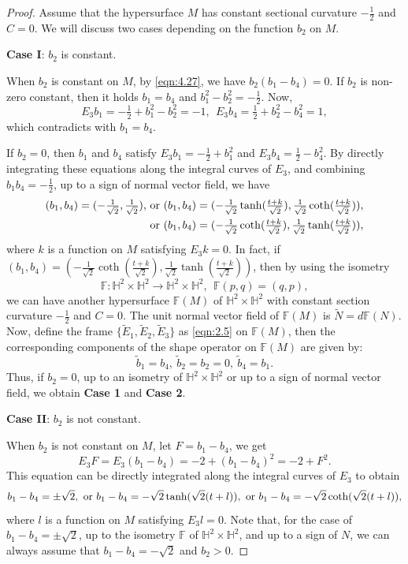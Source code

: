 \documentclass[reqno]{amsart}%
\theoremstyle{definition}
\numberwithin{equation}{section}
\begin{document}
\begin{proof}
Assume that the hypersurface $M$ has constant sectional curvature $-\frac{1}{2}$ and $C=0$.
We will discuss two cases depending on the function $b_2$ on $M$.

{\bf Case I}: $b_2$ is constant.

When $b_2$ is constant on $M$, by \eqref{eqn:4.27}, we have $b_2(b_1-b_4)=0$.
If $b_2$ is non-zero constant, then it holds $b_1=b_4$ and $b_1^2-b_2^2=-\frac{1}{2}$. Now,
$$
E_3b_1=-\tfrac{1}{2}+b_1^{2}-b_2^2=-1,\ \ E_3b_4=\tfrac{1}{2}+b_2^{2}-b_4^2=1,
$$
which contradicts with $b_1=b_4$.

If $b_2=0$, then $b_1$ and $b_4$ satisfy $E_3b_1=-\tfrac{1}{2}+b_1^2$ and $E_3b_4=\tfrac{1}{2}-b_4^2$.
By directly integrating these equations along the integral curves of $E_3$,
and combining $b_1b_4=-\tfrac{1}{2}$, up to a sign of normal vector field,
we have
$$
\begin{aligned}
(b_1,b_4)=(-\tfrac{1}{\sqrt{2}},\tfrac{1}{\sqrt{2}}),\ &{\rm or}\
(b_1,b_4)=(-\tfrac{1}{\sqrt{2}}\tanh(\tfrac{t+k}{\sqrt{2}}),
\tfrac{1}{\sqrt{2}}\coth(\tfrac{t+k}{\sqrt{2}})),\\
&  {\rm or}\ (b_1,b_4)=(-\tfrac{1}{\sqrt{2}}\coth(\tfrac{t+k}{\sqrt{2}}),
\tfrac{1}{\sqrt{2}}\tanh(\tfrac{t+k}{\sqrt{2}})),
\end{aligned}
$$
where $k$ is a function on $M$ satisfying $E_3k=0$.
In fact, if $(b_1,b_4)=(-\tfrac{1}{\sqrt{2}}\coth(\tfrac{t+k}{\sqrt{2}}),
\tfrac{1}{\sqrt{2}}\tanh(\tfrac{t+k}{\sqrt{2}}))$, then by using the isometry
$$
\mathbb{F}:\mathbb{H}^2\times \mathbb{H}^2\rightarrow\mathbb{H}^2\times \mathbb{H}^2,\ \
\mathbb{F}(p,q)=(q,p),
$$
we can have another hypersurface $\mathbb{F}(M)$ of $\mathbb{H}^2\times \mathbb{H}^2$
with constant section curvature $-\frac{1}{2}$ and $C=0$. The unit normal vector field
of $\mathbb{F}(M)$ is $\tilde{N}=d\mathbb{F}(N)$.
Now, define the frame $\{\tilde{E}_1,\tilde{E}_2,\tilde{E}_3\}$ as \eqref{eqn:2.5} on $\mathbb{F}(M)$,
then the corresponding components of the shape operator on $\mathbb{F}(M)$ are given by:
$$
\tilde{b}_1=b_4,\ \tilde{b}_2=b_2=0,\ \tilde{b}_4=b_1.
$$
Thus, if $b_2=0$, up to an isometry of $\mathbb{H}^2\times \mathbb{H}^2$
or up to a sign of normal vector field, we obtain {\bf Case 1} and {\bf Case 2}.

\vskip 2mm

{\bf Case II}: $b_2$ is not constant.

When $b_2$ is not constant on $M$, let $F=b_1-b_4$, we get
$$
E_3F=E_3(b_1-b_4)=-2+(b_1-b_4)^2=-2+F^2.
$$
This equation can be directly integrated along the integral curves of $E_3$
to obtain
\begin{equation}\label{eqn:5.1a}
b_1-b_4=\pm\sqrt{2},\ {\rm or}\ b_1-b_4=-\sqrt{2}\tanh(\sqrt{2}(t+l)),
\ {\rm or}\ b_1-b_4=-\sqrt{2}\coth(\sqrt{2}(t+l)),
\end{equation}
where $l$ is a function on $M$ satisfying $E_3l=0$.
Note that, for the case of $b_1-b_4=\pm\sqrt{2}$, up to the isometry $\mathbb{F}$ of $\mathbb{H}^2\times \mathbb{H}^2$, and up to a sign of $N$, %
we can always assume that $b_1-b_4=-\sqrt{2}$ and $b_2>0$.


\end{proof}
\end{document}
